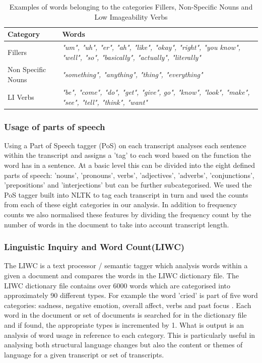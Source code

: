 \documentclass[12pt]{article}
\begin{document}
\begin{table}[H]
	\begin{center}
	\begin{tabular}{ | p{3cm} | p{10cm} |}
		\hline
		Category & Words \\ \hline
		Fillers & \textit{"um", "uh", "er", "ah", "like", "okay", "right",  "you know", "well", "so", "basically", "actually", "literally"} \\ \hline
		Non Specific Nouns & \textit{"something", "anything", "thing", "everything"} \\ \hline
		LI Verbs & \textit{"be", "come", "do", "get", "give", go", "know", "look", "make", "see", "tell", "think", "want"} \\ \hline
	\end{tabular}
	\caption{\label{tab:table-name}Examples of words belonging to the categories Fillers, Non-Specific Nouns and Low Imageability Verbs}
	\end{center} 
\end{table}

\subsubsection{Usage of parts of speech}
Using a Part of Speech tagger (PoS) on each transcript analyses each sentence within the transcript and assigns a 'tag' to each word based on the function the word has in a sentence. At a basic level this can be divided into the eight defined parts of speech: 'nouns', 'pronouns', verbs', 'adjectives', 'adverbs', 'conjunctions', 'prepositions' and 'interjections' but can be further subcategorised. We used the PoS tagger built into NLTK to tag each transcript in turn and used the counts from each of these eight categories in our analysis. In addition to frequency counts we also normalised these features by dividing the frequency count by the number of words in the document to take into account transcript length.

\subsubsection{Linguistic Inquiry and Word Count(LIWC)}
The LIWC is a text processor / semantic tagger which analysis words within a given a document and compares the words in the LIWC dictionary file. The LIWC dictionary file contains over 6000 words which are categorised into approximately 90 different types. For example the word 'cried' is part of five word categories: sadness, negative emotion, overall affect, verbs and past focus \cite{Pennebaker2015}. Each word in the document or set of documents is searched for in the dictionary file and if found, the appropriate types is incremented by 1. What is output is an analysis of word usage in reference to each category. This is particularly useful in analysing both structural language changes but also the content or themes of language for a given transcript or set of transcripts.
\end{document}
